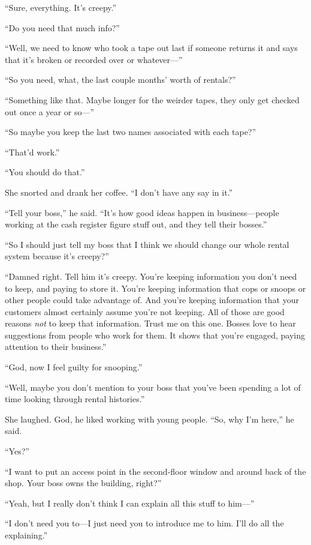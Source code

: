 \documentclass{article}
\begin{document}
``Sure, everything.  It's creepy.''

``Do you need that much info?''

``Well, we need to know who took a tape out last if someone returns it
and says that it's broken or recorded over or whatever---''

``So you need, what, the last couple months' worth of rentals?''

``Something like that.  Maybe longer for the weirder tapes, they only
get checked out once a year or so---''

``So maybe you keep the last two names associated with each tape?''

``That'd work.''

``You should do that.''

She snorted and drank her coffee.  ``I don't have any say in it.''

``Tell your boss,'' he said.  ``It's how good ideas happen in
business---people working at the cash register figure stuff out, and
they tell their bosses.''

``So I should just tell my boss that I think we should change our
whole rental system because it's creepy?''

``Damned right.  Tell him it's creepy.  You're keeping information you
don't need to keep, and paying to store it.  You're keeping
information that cops or snoops or other people could take advantage
of.  And you're keeping information that your customers almost
certainly assume you're not keeping.  All of those are good reasons
\textit{not} to keep that information.  Trust me on this one.  Bosses
love to hear suggestions from people who work for them.  It shows that
you're engaged, paying attention to their business.''

``God, now I feel guilty for snooping.''

``Well, maybe you don't mention to your boss that you've been spending
a lot of time looking through rental histories.''

She laughed.  God, he liked working with young people.  ``So, why I'm
here,'' he said.

``Yes?''

``I want to put an access point in the second-floor window and around
back of the shop.  Your boss owns the building, right?''

``Yeah, but I really don't think I can explain all this stuff to
him---''

``I don't need you to---I just need you to introduce me to him.  I'll
do all the explaining.''
\end{document}
